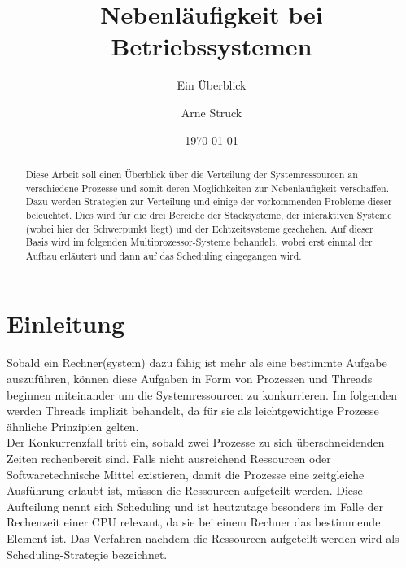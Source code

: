\title{Nebenläufigkeit bei Betriebssystemen}
\subtitle{Ein Überblick}

\author{Arne Struck}

  
\date{\today}

\maketitle


\begin{abstract}
Diese Arbeit soll einen Überblick über die Verteilung der Systemressourcen an verschiedene
Prozesse und somit deren Möglichkeiten zur Nebenläufigkeit verschaffen. Dazu werden Strategien zur Verteilung und einige der vorkommenden Probleme dieser beleuchtet. Dies wird für die drei Bereiche der Stacksysteme, der interaktiven Systeme (wobei hier der Schwerpunkt liegt) und der Echtzeitsysteme geschehen. Auf dieser Basis wird im folgenden Multiprozessor-Systeme behandelt, wobei erst einmal der Aufbau erläutert und dann auf das Scheduling eingegangen wird. 
\end{abstract}

\tableofcontents
\newpage

\section{Einleitung}
Sobald ein Rechner(system) dazu fähig ist mehr als eine bestimmte Aufgabe auszuführen, können diese Aufgaben in Form von Prozessen und Threads beginnen miteinander um die Systemressourcen zu konkurrieren.
Im folgenden werden Threads implizit behandelt, da für sie als leichtgewichtige Prozesse ähnliche Prinzipien gelten. \\
Der Konkurrenzfall tritt ein, sobald zwei Prozesse zu sich überschneidenden Zeiten rechenbereit sind. Falls nicht ausreichend Ressourcen oder Softwaretechnische Mittel existieren, damit die Prozesse eine zeitgleiche Ausführung erlaubt ist, müssen die Ressourcen aufgeteilt werden. Diese Aufteilung nennt sich Scheduling und ist heutzutage besonders im Falle der Rechenzeit einer CPU relevant, da sie bei einem Rechner das bestimmende Element ist. Das Verfahren nachdem die Ressourcen aufgeteilt werden wird als Scheduling-Strategie bezeichnet. \\

